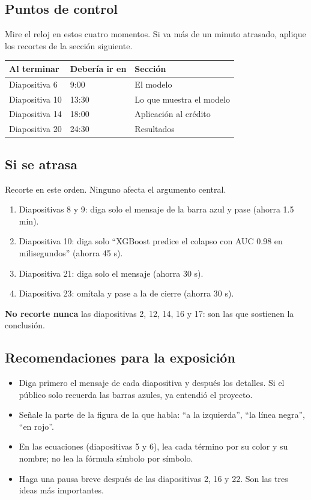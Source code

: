 \subsection{Puntos de control}
Mire el reloj en estos cuatro momentos. Si va más de un minuto atrasado, aplique los
recortes de la sección siguiente.

\begin{center}
\begin{tabular}{lll}
\toprule
Al terminar & Debería ir en & Sección \\
\midrule
Diapositiva 6 & 9:00 & El modelo \\
Diapositiva 10 & 13:30 & Lo que muestra el modelo \\
Diapositiva 14 & 18:00 & Aplicación al crédito \\
Diapositiva 20 & 24:30 & Resultados \\
\bottomrule
\end{tabular}
\end{center}

\subsection{Si se atrasa}
Recorte en este orden. Ninguno afecta el argumento central.
\begin{enumerate}
\item Diapositivas 8 y 9: diga solo el mensaje de la barra azul y pase (ahorra 1.5 min).
\item Diapositiva 10: diga solo ``XGBoost predice el colapso con AUC 0.98 en
milisegundos'' (ahorra 45 s).
\item Diapositiva 21: diga solo el mensaje (ahorra 30 s).
\item Diapositiva 23: omítala y pase a la de cierre (ahorra 30 s).
\end{enumerate}
\textbf{No recorte nunca} las diapositivas 2, 12, 14, 16 y 17: son las que sostienen la
conclusión.

\subsection{Recomendaciones para la exposición}
\begin{itemize}
\item Diga primero el mensaje de cada diapositiva y después los detalles. Si el público
solo recuerda las barras azules, ya entendió el proyecto.
\item Señale la parte de la figura de la que habla: ``a la izquierda'', ``la línea
negra'', ``en rojo''.
\item En las ecuaciones (diapositivas 5 y 6), lea cada término por su color y su nombre;
no lea la fórmula símbolo por símbolo.
\item Haga una pausa breve después de las diapositivas 2, 16 y 22. Son las tres ideas
más importantes.
\end{itemize}
